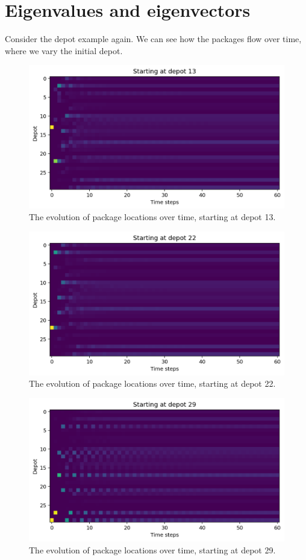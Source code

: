 \documentclass[a4paper, openany]{memoir}
\begin{document}
    \section{Eigenvalues and eigenvectors}
    Consider the depot example again. We can see how the packages flow over time, where we vary the initial depot.
    \begin{figure}[H]
        \centering
        \includegraphics[scale=0.4]{src/3.24 Start at 13.png}
        \caption{The evolution of package locations over time, starting at depot 13.}
    \end{figure}
    \begin{figure}[H]
        \centering
        \includegraphics[scale=0.4]{src/3.25 Start at 22.png}
        \caption{The evolution of package locations over time, starting at depot 22.}
    \end{figure}
    \begin{figure}[H]
        \centering
        \includegraphics[scale=0.4]{src/3.26 Start at 29.png}
        \caption{The evolution of package locations over time, starting at depot 29.}
    \end{figure}
\end{document}

